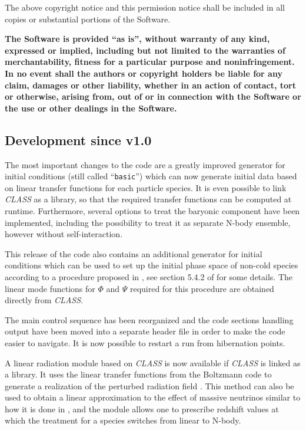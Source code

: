 \documentclass[a4paper,10pt]{article}
\begin{document}
The above copyright notice and this permission notice shall be included in
all copies or substantial portions of the Software.
  
\textbf{The Software is provided ``as is'', without warranty of any kind, expressed or
implied, including but not limited to the warranties of merchantability,
fitness for a particular purpose and noninfringement. In no event shall the
authors or copyright holders be liable for any claim, damages or other
liability, whether in an action of contact, tort or otherwise, arising from,
out of or in connection with the Software or the use or other dealings in
the Software.}

\subsection{Development since v1.0}

The most important changes to the code are a greatly improved generator for initial conditions (still called
``\texttt{basic}'') which can now generate initial data based on linear transfer functions for each particle
species. It is even possible to link \textit{CLASS} as a library, so that the required transfer functions
can be computed at runtime. Furthermore, several options to treat the baryonic component have been implemented, including
the possibility to treat it as separate N-body ensemble, however without self-interaction.

This release of the code also contains an additional generator for initial conditions
which can be used to set up the initial phase space of non-cold species according to a procedure proposed in \cite{Ma:1993xs}, see
section 5.4.2 of \cite{Adamek:2016zes} for some details. The linear mode functions for $\mathsf{\Phi}$ and $\mathsf{\Psi}$
required for this procedure are obtained directly from \textit{CLASS}.

The main control sequence has been reorganized and the code sections handling output have been moved into
a separate header file in order to make the code easier to navigate. It is now possible to restart a run from hibernation points.

A linear radiation module based on \textit{CLASS} is now available if \textit{CLASS} is linked as a library. It uses the linear transfer
functions from the Boltzmann code to generate a realization of the perturbed radiation field \cite{Adamek:2017xxx}. This method can also
be used to obtain a linear approximation to the effect of massive neutrinos similar to how it is done in \cite{Brandbyge:2008js}, and
the module allows one to prescribe redshift values at which the treatment for a species switches from linear to N-body. 
\end{document}

